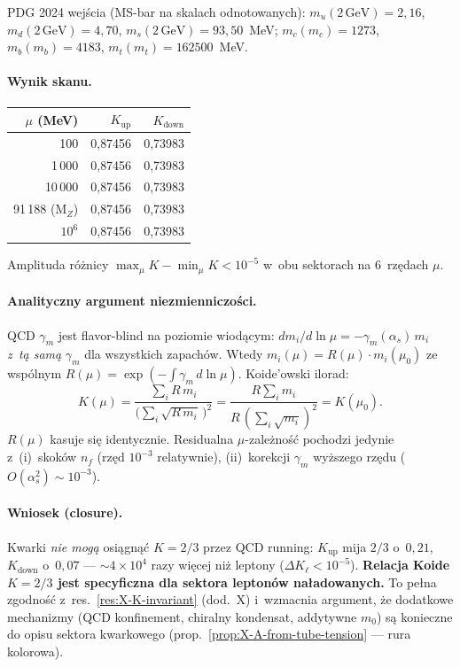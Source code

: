 PDG 2024 wej\'scia (MS-bar na skalach odnotowanych):
$m_u(2\,\mathrm{GeV})=2{,}16$,
$m_d(2\,\mathrm{GeV})=4{,}70$,
$m_s(2\,\mathrm{GeV})=93{,}50$~MeV;
$m_c(m_c)=1273$,
$m_b(m_b)=4183$,
$m_t(m_t)=162500$~MeV.

\paragraph{Wynik skanu.}

\begin{center}\footnotesize
\begin{tabular}{@{}rrr@{}}
\toprule
$\mu$ (MeV) & $K_\text{up}$ & $K_\text{down}$ \\
\midrule
100         & 0{,}87456 & 0{,}73983 \\
1\,000      & 0{,}87456 & 0{,}73983 \\
10\,000     & 0{,}87456 & 0{,}73983 \\
91\,188 (M$_Z$) & 0{,}87456 & 0{,}73983 \\
$10^6$      & 0{,}87456 & 0{,}73983 \\
\bottomrule
\end{tabular}
\end{center}

\noindent
Amplituda r\'o\.znicy $\max_\mu K - \min_\mu K < 10^{-5}$ w~obu sektorach
na 6~rz\k{e}dach $\mu$.

\paragraph{Analityczny argument niezmienniczo\'sci.}
QCD $\gamma_m$ jest flavor-blind na poziomie wiod\k{a}cym:
$dm_i/d\ln\mu = -\gamma_m(\alpha_s)\,m_i$ \emph{z~t\k{a} sam\k{a}} $\gamma_m$
dla wszystkich zapach\'ow. Wtedy $m_i(\mu) = R(\mu)\cdot m_i(\mu_0)$ ze wsp\'olnym
$R(\mu) = \exp(-\int \gamma_m\,d\ln\mu)$. Koide'owski ilorad:
\begin{equation}
  K(\mu) = \frac{\sum_i R\,m_i}{\bigl(\sum_i\!\sqrt{R\,m_i}\,\bigr)^2}
        = \frac{R\sum_i m_i}{R\,(\sum_i \!\sqrt{m_i})^2}
        = K(\mu_0).
  \label{eq:P4-K-RG-inv}
\end{equation}
$R(\mu)$ kasuje si\k{e} identycznie. Residualna $\mu$-zale\.zno\'s\'c pochodzi
jedynie z~(i)~skok\'ow $n_f$ (rz\k{e}d $10^{-3}$ relatywnie), (ii)~korekcji
$\gamma_m$ wy\.zszego rz\k{e}du ($O(\alpha_s^2) \sim 10^{-3}$).

\paragraph{Wniosek (closure).}
Kwarki \emph{nie mog\k{a}} osi\k{a}gn\k{a}\'c $K=2/3$ przez QCD running:
$K_\text{up}$ mija $2/3$ o~$0{,}21$, $K_\text{down}$ o~$0{,}07$ ---
$\sim 4\times 10^4$ razy wi\k{e}cej ni\.z leptony ($\Delta K_\ell < 10^{-5}$).
\textbf{Relacja Koide $K=2/3$ jest specyficzna dla sektora lepton\'ow
na\l{}adowanych.}
To pe\l{}na zgodno\'s\'c z~res.~\ref{res:X-K-invariant} (dod.~X)
i~wzmacnia argument, \.ze dodatkowe mechanizmy (QCD konfinement,
chiralny kondensat, addytywne $m_0$) s\k{a} konieczne do opisu
sektora kwarkowego (prop.~\ref{prop:X-A-from-tube-tension}
--- rura kolorowa).

